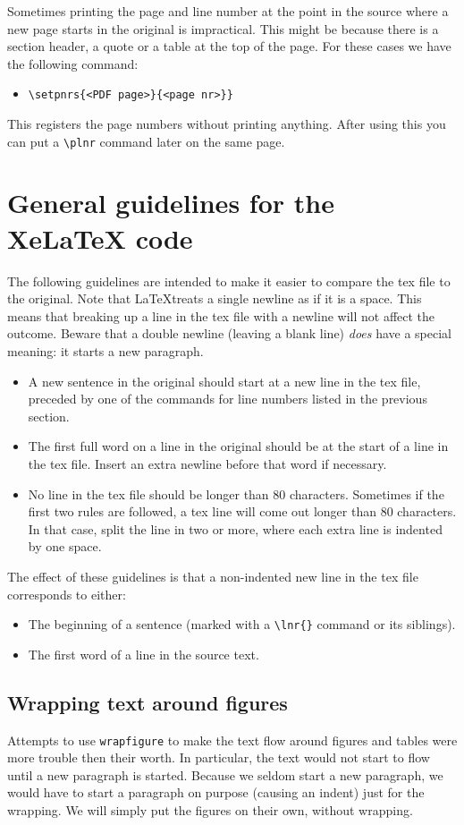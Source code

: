 \documentclass{report}
\begin{document}
Sometimes printing the page and line number at the point in the source where
a new page starts in the original is impractical.
This might be because there is a section header, a quote or a table at the top
of the page.
For these cases we have the following command: 
\begin{itemize}
\item \verb+\setpnrs{<PDF page>}{<page nr>}}+
\end{itemize}
This registers the page numbers without printing anything.
After using this you can put a \verb+\plnr+ command later on the same page.

\section{General guidelines for the XeLaTeX code}
The following guidelines are intended to make it easier to compare the
tex file to the original.
Note that \LaTeX treats a single newline as if it is a space. This means that
breaking up a line in the tex file with a newline will not affect the outcome.
Beware that a double newline (leaving a blank line) \emph{does} have a
special meaning: it starts a new paragraph.
\begin{itemize}
\item A new sentence in the original should start at a new line in the tex file,
preceded by one of the commands for line numbers listed in the previous section.
\item The first full word on a line in the original should be at the start
of a line in the tex file.
Insert an extra newline before that word if necessary.
\item No line in the tex file should be longer than 80 characters.
Sometimes if the first two rules are followed, a tex line will come out
longer than 80 characters. In that case, split the line in two or more,
where each extra line is indented by one space.
\end{itemize}
The effect of these guidelines is that a non-indented new line
in the tex file corresponds
to either:
\begin{itemize}
\item The beginning of a sentence (marked with a \verb+\lnr{}+ command or
its siblings).
\item The first word of a line in the source text.
\end{itemize}

\subsection{Wrapping text around figures}
Attempts to use \verb+wrapfigure+ to make the text flow around figures
and tables were
more trouble then their worth. In particular, the text would not start to
flow until a new paragraph is started. Because we seldom start a new paragraph,
we would have to start a paragraph on purpose (causing an indent) just for the
wrapping. We will simply put the figures on their own, without wrapping.
\end{document}
